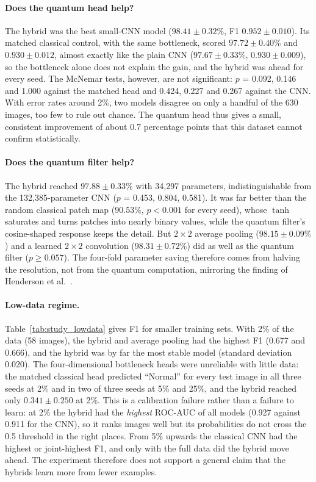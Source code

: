 \paragraph{Does the quantum head help?} The \cq{} hybrid was the best
small-CNN model ($98.41 \pm 0.32\%$, F1 $0.952 \pm 0.010$). Its matched
classical control, with the same bottleneck, scored $97.72 \pm 0.40\%$ and
$0.930 \pm 0.012$, almost exactly like the plain CNN ($97.67 \pm 0.33\%$,
$0.930 \pm 0.009$), so the bottleneck alone does not explain the gain, and
the hybrid was ahead for every seed. The McNemar tests, however, are not
significant: $p$ = 0.092, 0.146 and 1.000 against the matched head and
0.424, 0.227 and 0.267 against the CNN. With error rates around 2\%, two
models disagree on only a handful of the 630 images, too few to rule out
chance. The quantum head thus gives a small, consistent improvement of
about 0.7 percentage points that this dataset cannot confirm statistically.

\paragraph{Does the quantum filter help?} The \qc{} hybrid reached
$97.88 \pm 0.33\%$ with 34,297 parameters, indistinguishable from the
132,385-parameter CNN ($p$ = 0.453, 0.804, 0.581). It was far better than
the random classical patch map ($90.53\%$, $p < 0.001$ for every seed),
whose $\tanh$ saturates and turns patches into nearly binary values, while
the quantum filter's cosine-shaped response keeps the detail. But
$2\times2$ average pooling ($98.15 \pm 0.09\%$) and a learned $2\times2$
convolution ($98.31 \pm 0.72\%$) did as well as the quantum filter
($p \geq 0.057$). The four-fold parameter saving therefore comes from
halving the resolution, not from the quantum computation, mirroring the
finding of Henderson et al.~\cite{henderson2020}.

\paragraph{Low-data regime.} Table~\ref{tab:study_lowdata} gives F1 for
smaller training sets. With 2\% of the data (58 images), the \qc{} hybrid
and average pooling had the highest F1 (0.677 and 0.666), and the \qc{}
hybrid was by far the most stable model (standard deviation 0.020). The
four-dimensional bottleneck heads were unreliable with little data: the
matched classical head predicted ``Normal'' for every test image in all
three seeds at 2\% and in two of three seeds at 5\% and 25\%, and the \cq{}
hybrid reached only $0.341 \pm 0.250$ at 2\%. This is a calibration failure
rather than a failure to learn: at 2\% the \cq{} hybrid had the
\emph{highest} ROC-AUC of all models (0.927 against 0.911 for the CNN), so it
ranks images well but its probabilities do not cross the 0.5 threshold in
the right places. From 5\% upwards the classical CNN had the highest or
joint-highest F1, and only with the full data did the \cq{} hybrid move
ahead. The experiment therefore does not support a general claim that the
hybrids learn more from fewer examples.


